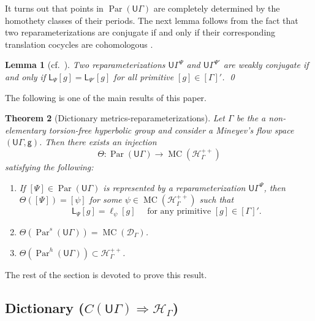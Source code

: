 \documentclass[twoside]{amsart}
\newtheorem{theorem}{Theorem}[section]
\newtheorem{lemma}[theorem]{Lemma}
\theoremstyle{definition}
\numberwithin{equation}{section}
\numberwithin{theorem}{section}
\newcommand{\msf}[1]{\mathsf{#1}}
\newcommand{\calH}{\mathcal{H}}
\newcommand{\scrD}{\mathscr{D}}
\newcommand{\scrH}{\mathscr{H}}
\newcommand{\G}{\Gamma}
\newcommand{\Thet}{\Theta}
\newcommand{\p}{\psi}
\DeclareMathOperator{\Par}{Par}
\newcommand{\Ra}{\Rightarrow}
\newcommand{\ra}{\rightarrow}
\newcommand{\UG}{\msf{U}\G}
\DeclareMathOperator{\MC}{MC}
\newcommand{\sfP}{\mathsf{\Psi}}
\begin{document}
It turns out that points in $\Par(\UG)$ are completely determined by the homothety classes of their periods. The next lemma follows from the fact that two reparameterizations are conjugate if and only if their corresponding translation cocycles are cohomologous \cite[Proposition~1.17]{tholozan}.

\begin{lemma}[{cf.~\cite[Corollary~1.19]{tholozan}}]\label{lemm:weak.conj}
    Two reparameterizations $\UG^\sfP$ and $\UG^{\sfP'}$ are weakly conjugate if and only if $\msf{L}_{\sfP}[g]=\msf{L}_{\sfP'}[g]$ for all primitive $[g]\in [\G]'$. \qed 
\end{lemma}

The following is one of the main results of this paper.

\begin{theorem}[Dictionary metrics-reparameterizations]\label{thm:dictionary}
    Let $\G$ be the a non-elementary torsion-free hyperbolic group and consider a Mineyev's flow space $(\UG,\msf{g})$. Then there exists an injection \begin{equation*}
        \Thet:\Par(\UG) \ra \MC({\scrH^{++}_\G})
    \end{equation*} satisfying the following:
    \begin{enumerate}
    \item If $[\sfP] \in \Par(\UG)$ is represented by a reparameterization $\UG^\sfP$, then $\Thet([\sfP])=[\psi]$ for some $\psi\in \MC(\calH^{++}_\G)$ such that 
    \[\msf{L}_{\sfP}[g]=\ell_{\p}[g] \quad \text{ for any primitive }[g]\in [\G]'.\]
    \item $\Thet(\Par^s(\UG))=\MC(\scrD_\G)$.
    \item $\Thet(\Par^h(\UG))\subset \scrH^{++}_\G$. 
    \end{enumerate}
\end{theorem}

The rest of the section is devoted to prove this result.












\subsection{Dictionary ($C(\UG) \Ra \calH_\G$)}\label{subsec:dictionaryC->H}
\end{document}
